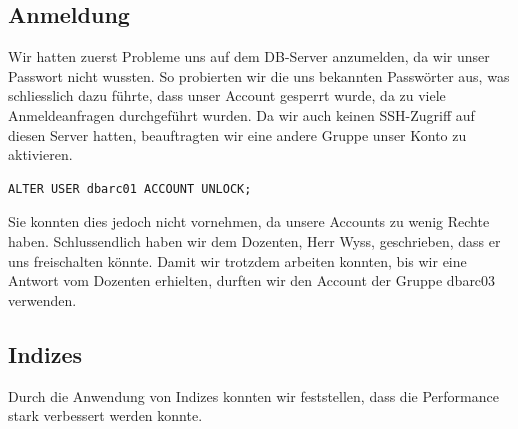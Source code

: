 \documentclass[10pt]{article}
\begin{document}
\subsection{Anmeldung}
Wir hatten zuerst Probleme uns auf dem DB-Server anzumelden, da wir unser Passwort nicht wussten. So 
probierten wir die uns bekannten Passwörter aus, was schliesslich dazu führte, dass unser Account
gesperrt wurde, da zu viele Anmeldeanfragen durchgeführt wurden. Da wir auch keinen SSH-Zugriff auf diesen 
Server hatten, beauftragten wir eine andere Gruppe unser Konto zu aktivieren.
\begin{lstlisting}[style=sql]
ALTER USER dbarc01 ACCOUNT UNLOCK;
\end{lstlisting}
Sie konnten dies jedoch nicht vornehmen, da unsere Accounts zu wenig Rechte haben. Schlussendlich 
haben wir dem Dozenten, Herr Wyss, geschrieben, dass er uns freischalten könnte. Damit wir trotzdem 
arbeiten konnten, bis wir eine Antwort vom Dozenten erhielten, durften wir den Account der Gruppe dbarc03 
verwenden.

\subsection{Indizes}
Durch die Anwendung von Indizes konnten wir feststellen, dass die Performance stark verbessert werden konnte.

\end{document}
